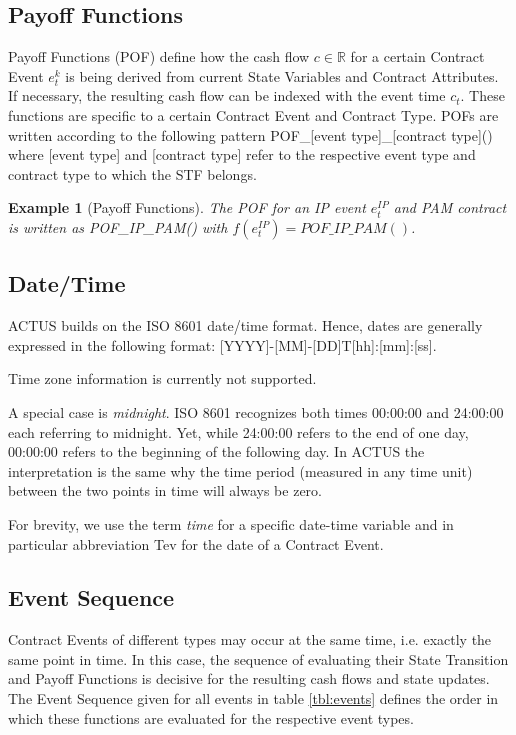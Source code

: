 \documentclass[9pt,oneside]{amsart}
\newtheorem{example}{Example}
\newcommand{\Real}{\mathbb{R}}
\newcommand{\pof}[2]{POF\_#1\_#2()}
\newcommand{\fev}[1]{f(#1)}
\begin{document}
\begin{multicols}{2}
\subsection{Payoff Functions}\label{sec:pof}

Payoff Functions (POF) define how the cash flow $c\in\Real$ for a certain Contract Event $e_t^k$ is being derived from current State Variables and Contract Attributes. If necessary, the resulting cash flow can be indexed with the event time $c_t$. These functions are specific to a certain Contract Event and Contract Type. POFs are written according to the following pattern \pof{[event type]}{[contract type]} where [event type] and [contract type] refer to the respective event type and contract type to which the STF belongs.

\begin{example}[Payoff Functions]
The POF for an IP event $e_t^{IP}$ and PAM contract is written as \pof{IP}{PAM} with $\fev{e_t^{IP}}=\pof{IP}{PAM}$.
\end{example}


\subsection{Date/Time}\label{sec:time}

ACTUS builds on the ISO 8601 date/time format. Hence, dates are generally expressed in the following format: [YYYY]-[MM]-[DD]T[hh]:[mm]:[ss].

Time zone information is currently not supported.

A special case is \textit{midnight}. ISO 8601 recognizes both times 00:00:00 and 24:00:00 each referring to midnight. Yet, while 24:00:00 refers to the end of one day, 00:00:00 refers to the beginning of the following day. In ACTUS the interpretation is the same why the time period (measured in any time unit) between the two points in time will always be zero. 

For brevity, we use the term \textit{time} for a specific date-time variable and in particular abbreviation Tev for the date of a Contract Event.


\subsection{Event Sequence}\label{sec:eventseq}

Contract Events of different types may occur at the same time, i.e. exactly the same point in time. In this case, the sequence of evaluating their State Transition and Payoff Functions is decisive for the resulting cash flows and state updates. The Event Sequence given for all events in table \ref{tbl:events} defines the order in which these functions are evaluated for the respective event types.



\end{multicols}
\end{document}
